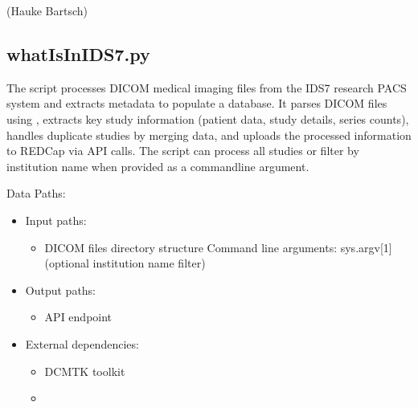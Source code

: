 \documentclass[letterpaper,10pt,english]{sphinxmanual}
\begin{document}
\sphinxAtStartPar
(Hauke Bartsch)

\sphinxstepscope


\subsection{whatIsInIDS7.py}
\label{\detokenize{Architecture/scripts/whatIsInIDS7:whatisinids7-py}}\label{\detokenize{Architecture/scripts/whatIsInIDS7::doc}}
\sphinxAtStartPar
The  script processes DICOM medical imaging files from the IDS7 research PACS system and extracts metadata to populate a  database. It parses DICOM files using , extracts key study information (patient data, study details, series counts), handles duplicate studies by merging data, and uploads the processed information to REDCap via API calls. The script can process all studies or filter by institution name when provided as a command\sphinxhyphen{}line argument.

\sphinxAtStartPar
{}


\sphinxAtStartPar
{}


\sphinxAtStartPar
Data Paths:
\begin{itemize}
\item {} 
\sphinxAtStartPar
Input paths:
\begin{itemize}
\item {} 
\sphinxAtStartPar
{} \sphinxhyphen{} DICOM files directory structure Command line arguments: sys.argv{[}1{]} (optional institution name filter)

\end{itemize}

\item {} 
\sphinxAtStartPar
Output paths:
\begin{itemize}
\item {} 
\sphinxAtStartPar
{} API endpoint

\end{itemize}

\item {} 
\sphinxAtStartPar
External dependencies:
\begin{itemize}
\item {} 
\sphinxAtStartPar
{} \sphinxhyphen{} DCMTK toolkit

\item {} 
\sphinxAtStartPar
{}

\end{itemize}

\end{itemize}
\end{document}
